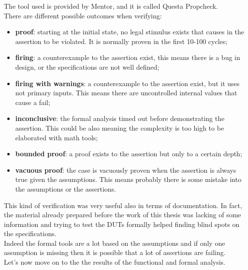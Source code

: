 The tool used is provided by Mentor, and it is called Questa Propcheck.\\
There are different possible outcomes when verifying:
\begin{itemize}
    \item \textbf{proof}: starting at the initial state, no legal stimulus exists that causes in the assertion to be violated. It is normally proven in the first 10-100 cycles;
    
    \item \textbf{firing}: a counterexample to the assertion exist, this means there is a bug in design, or the specifications are not well defined;
    
    \item \textbf{firing with warnings}: a counterexample to the assertion exist, but it uses not primary inputs. This means there are uncontrolled internal values that cause a fail;
    
    \item \textbf{inconclusive}: the formal analysis timed out before demonstrating the assertion. This could be also meaning the complexity is too high to be elaborated with math tools; 
    
    \item \textbf{bounded proof}: a proof exists to the assertion but only to a certain depth;
    
    \item \textbf{vacuous proof}: the case is vacuously proven when the assertion is always true given the assumptions. This means probably there is some mistake into the assumptions or the assertions.
\end{itemize}


This kind of verification was very useful also in terms of documentation. In fact, the material already prepared before the work of this thesis was lacking of some information and trying to test the DUTs formally helped finding blind spots on the specifications.\\
Indeed the formal tools are a lot based on the assumptions and if only one assumption is missing then it is possible that a lot of assertions are failing.\\

Let's now move on to the the results of the functional and formal analysis.
